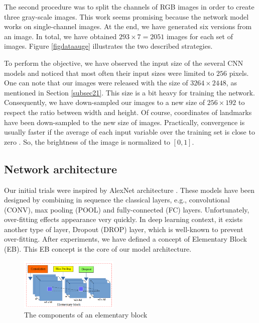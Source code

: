\documentclass[review]{elsarticle}
\begin{document}
The second procedure was to split the channels of RGB images in order to create three gray-scale images. This work seems promising because the network model works on single-channel images. At the end, we have generated six versions from an image. In total, we have obtained $293 \times 7 = 2051$ images for each set of images. Figure \ref{figdataauge} illustrates the two described strategies.

To perform the objective, we have observed the input size of the several CNN models \cite{krizhevsky2012imagenet, ciregan2012multi, cintas2016automatic, sun2013deep} and noticed that most often their input sizes were limited to $256$ pixels. One can note that our images were released with the size of $3264 \times 2448$, as mentioned in Section \ref{subsec21}. This size is a bit heavy for training the network. Consequently, we have down-sampled our images to a new size of $256 \times 192$ to respect the ratio between width and height. Of course, coordinates of landmarks have been down-sampled to the new size of images. Practically, convergence is usually faster if the average of each input variable over the training set is close to zero \cite{lecun2012efficient}. So, the brightness of the image is normalized to $[0,1]$.%

\subsection{Network architecture}
\label{subsec22}
Our initial trials were inspired by AlexNet architecture \cite{krizhevsky2012imagenet}. These models have been designed by combining in sequence the classical layers, e.g., convolutional (CONV), max pooling (POOL) and fully-connected (FC) layers. Unfortunately, over-fitting effects appearance very quickly. In deep learning context, it exists another type of layer, Dropout (DROP) layer, which is well-known to prevent over-fitting. After experiments, we have defined a concept of Elementary Block (EB). This EB concept is the core of our model architecture. 

\begin{figure}[h!]
	\centering
	\includegraphics[width=0.42\textwidth]{images/eblock}
	\caption{The components of an elementary block}
	\label{figeblock}
\end{figure}
\end{document}

